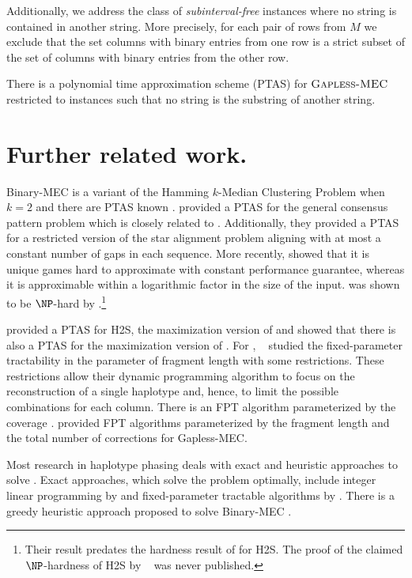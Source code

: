 Additionally, we address the class of \emph{subinterval-free} \GMEC instances where no string is contained in another string.
More precisely, for each pair of rows from $M$ we exclude that the set columns with binary entries from one row is a strict subset of
the set of columns with binary entries from the other row.

\begin{theorem}\label{thm:ptas}
    There is a polynomial time approximation scheme (PTAS) for $\textsc{Gapless-MEC}$ restricted to instances such that no string is the substring of another string.
\end{theorem}

\section{Further related work.}
Binary-MEC is a variant of the Hamming $k$-Median Clustering Problem when $k = 2$ and there are PTAS known \citep{JXL04_k, OR02_polynomial}. 
\cite{LMW02_finding} provided a PTAS for the general consensus pattern problem which is closely related to \MEC.
Additionally, they provided a PTAS for a restricted version of the star alignment problem aligning with at most a constant number of gaps in each sequence.
More recently, \cite{BDK+16_minimum} showed that it is unique games hard to approximate \MEC with constant performance guarantee, whereas it is approximable within a logarithmic factor in the size of the input. 
\GMEC was shown to be $\NP$-hard by \cite{Cilibrasi2007}.\footnote{Their result predates the hardness result of \cite{Fei14_np} for H2S. The proof of the claimed $\NP$-hardness of H2S by ~\cite{KPR98_segmentation} was never published.}

\cite{AS99_two} provided a PTAS for H2S, the maximization version of \BMEC and \cite{WUB13_monochromatic} showed that there is also a PTAS for the maximization version of \MEC.
For \GMEC, ~\cite{he2010optimal} studied the fixed-parameter tractability in the parameter of fragment length with some restrictions.
These restrictions allow their dynamic programming algorithm to focus on the reconstruction of a single haplotype and, hence, to limit the possible combinations for each column.
There is an FPT algorithm parameterized by the coverage \citep{Patterson2015}. 
\cite{BDK+16_minimum} provided FPT algorithms parameterized by the fragment length and the total number of corrections for Gapless-MEC.

Most research in haplotype phasing deals with exact and heuristic approaches to solve \MEC.
Exact approaches, which solve the problem optimally, include integer linear programming by \cite{Fouilhoux2012} and fixed-parameter tractable algorithms by \cite{he2010optimal, Pirola2015}.
There is a greedy heuristic approach proposed to solve Binary-MEC \citep{Bansal2008}. 


